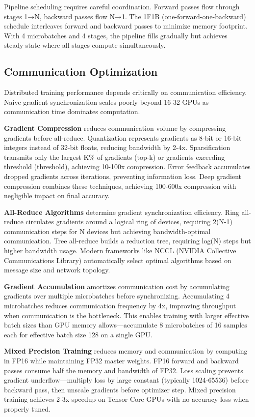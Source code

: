Pipeline scheduling requires careful coordination. Forward passes flow through stages 1→N, backward passes flow N→1. The 1F1B (one-forward-one-backward) schedule interleaves forward and backward passes to minimize memory footprint. With 4 microbatches and 4 stages, the pipeline fills gradually but achieves steady-state where all stages compute simultaneously.

\subsection{Communication Optimization}

Distributed training performance depends critically on communication efficiency. Naive gradient synchronization scales poorly beyond 16-32 GPUs as communication time dominates computation.

\textbf{Gradient Compression} reduces communication volume by compressing gradients before all-reduce. Quantization represents gradients as 8-bit or 16-bit integers instead of 32-bit floats, reducing bandwidth by 2-4x. Sparsification transmits only the largest K\% of gradients (top-k) or gradients exceeding threshold (threshold), achieving 10-100x compression. Error feedback accumulates dropped gradients across iterations, preventing information loss. Deep gradient compression combines these techniques, achieving 100-600x compression with negligible impact on final accuracy.

\textbf{All-Reduce Algorithms} determine gradient synchronization efficiency. Ring all-reduce circulates gradients around a logical ring of devices, requiring 2(N-1) communication steps for N devices but achieving bandwidth-optimal communication. Tree all-reduce builds a reduction tree, requiring log(N) steps but higher bandwidth usage. Modern frameworks like NCCL (NVIDIA Collective Communications Library) automatically select optimal algorithms based on message size and network topology.

\textbf{Gradient Accumulation} amortizes communication cost by accumulating gradients over multiple microbatches before synchronizing. Accumulating 4 microbatches reduces communication frequency by 4x, improving throughput when communication is the bottleneck. This enables training with larger effective batch sizes than GPU memory allows---accumulate 8 microbatches of 16 samples each for effective batch size 128 on a single GPU.

\textbf{Mixed Precision Training} reduces memory and communication by computing in FP16 while maintaining FP32 master weights. FP16 forward and backward passes consume half the memory and bandwidth of FP32. Loss scaling prevents gradient underflow---multiply loss by large constant (typically 1024-65536) before backward pass, then unscale gradients before optimizer step. Mixed precision training achieves 2-3x speedup on Tensor Core GPUs with no accuracy loss when properly tuned.

